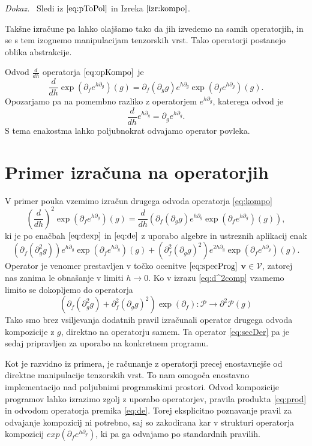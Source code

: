 \documentclass[a4paper, 12pt]{book}
\newcommand{\VV}{\mathcal{V}}
\newcommand{\vv}{\mathbf{v}}
\newcommand{\dP}{\mathcal{P}}
\newcommand{\D}{\partial}
\newenvironment{dokaz}{\emph{Dokaz.}\ }{\hspace{\fill}{$\Box$}}
\begin{document}
   \begin{dokaz}
   Sledi iz $\eqref{eq:pToPol}$ in Izreka $\ref{izr:kompo}$.
   \end{dokaz}

\noindent Takšne izračune pa lahko olajšamo tako da jih izvedemo na samih operatorjih, in se s tem izognemo manipulacijam tenzorskih vrst. Tako operatorji postanejo oblika abstrakcije. 

\noindent Odvod $\frac{d}{dh}$ operatorja $\eqref{eq:opKompo}$ je
\begin{equation}\label{eq:dexp}
 \frac{d}{dh}\exp(\D_fe^{h\D_g})(g)=\D_f(\D_gg)e^{h\D_g}\exp(\D_fe^{h\D_g})(g).
 \end{equation}
Opozarjamo pa na pomembno razliko z operatorjem $e^{h\D_g}$, katerega odvod je
 \begin{equation}\label{eq:de}
\frac{d}{dh}e^{h\D_g}=\D_ge^{h\D_g}.
 \end{equation}
 S tema enakostma lahko poljubnokrat odvajamo operator povleka.
 
 \section{Primer izračuna na operatorjih}

V primer pouka vzemimo izračun drugega odvoda operatorja \eqref{eq:kompo}
$$\left(\frac{d}{dh}\right)^2\exp\left(\D_fe^{h\D_g}\right)(g)=\frac{d}{dh}\left(\D_f(\D_gg)e^{h\D_g}\exp\left(\D_fe^{h\D_g}\right)(g)\right),$$
ki je po enačbah $\eqref{eq:dexp}$ in $\eqref{eq:de}$ z uporabo algebre in ustreznih aplikacij enak
\begin{equation}\label{eq:d^2comp}
 \left(\D_f(\D^2_gg)\right)e^{h\D_g}\exp(\D_fe^{h\D_g})(g)+(\D^2_f(\D_gg)^2)e^{2h\D_g}\exp(\D_fe^{h\D_g})(g).
 \end{equation}
Operator je venomer prestavljen v točko ocenitve $\eqref{eq:specProg}$ $\vv\in\VV$, zatorej nas zanima le obnašanje v limiti $h\to 0$. Ko v izrazu \eqref{eq:d^2comp} vzamemo limito se dokopljemo do operatorja
 \begin{equation}\label{eq:secDer}
	\left(\D_f(\D^2_gg)+\D^2_f(\D_gg)^2\right)\exp(\D_f):\dP\to\D^2\dP(g)
 \end{equation}
Tako smo brez vsiljevanja dodatnih pravil izračunali operator drugega odvoda kompozicije z $g$, direktno na operatorju samem. Ta operator \eqref{eq:secDer} pa je sedaj pripravljen za uporabo na konkretnem programu.

Kot je razvidno iz primera, je računanje z operatorji precej enostavnejše od direktne manipulacije tenzorskih vrst. To nam omogoča enostavno implementacijo nad poljubnimi programskimi prostori. Odvod kompozicije programov lahko izrazimo zgolj z uporabo operatorjev, pravila produkta \eqref{eq:prod} in odvodom operatorja premika \eqref{eq:de}. Torej eksplicitno poznavanje pravil za odvajanje kompozicij ni potrebno, saj so zakodirana kar v strukturi operatorja kompozicij $exp(\D_fe^{h\D_g})$, ki pa ga odvajamo po standardnih pravilih.
\end{document}
